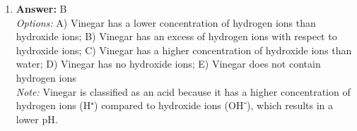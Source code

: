\documentclass[12pt]{article}
\begin{document}
\begin{enumerate}[label=\arabic*.]
\\ \textit{Note:} A longitudinal section of a shoot tip would most likely provide examples of mitotic cell divisions because the shoot tip is a region of active growth where cells are rapidly dividing to support the development of new plant tissues.
\item \textbf{Answer:} B
\\ \textit{Options:} A) Vinegar has a lower concentration of hydrogen ions than hydroxide ions; B) Vinegar has an excess of hydrogen ions with respect to hydroxide ions; C) Vinegar has a higher concentration of hydroxide ions than water; D) Vinegar has no hydroxide ions; E) Vinegar does not contain hydrogen ions
\\ \textit{Note:} Vinegar is classified as an acid because it has a higher concentration of hydrogen ions (H⁺) compared to hydroxide ions (OH⁻), which results in a lower pH.
\end{enumerate}
\end{document}
